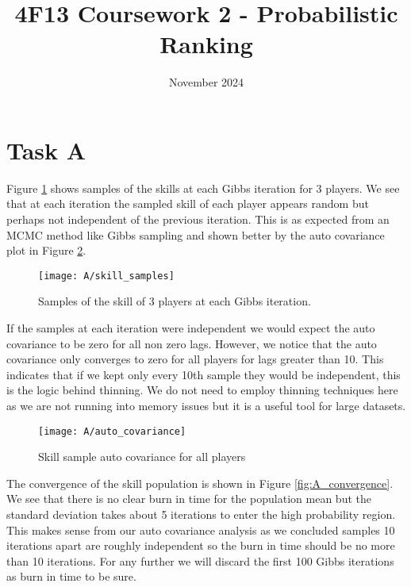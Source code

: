 \documentclass[11pt]{article}
\title{\vspace{-2cm}4F13 Coursework 2 - Probabilistic Ranking}
\author{}
\date{November 2024}
\begin{document}
% 

\setcounter{page}{1}

\maketitle

\section{Task A}

Figure \ref{fig:A_skill_samples} shows samples of the skills at each Gibbs iteration for 3 players. We see that at each iteration the sampled skill of each player appears random but perhaps not independent of the previous iteration. This is as expected from an MCMC method like Gibbs sampling and shown better by the auto covariance plot in Figure \ref{fig:A_auto_covariance}. 

\begin{figure}[h]
    \centering
    \texttt{[image: A/skill\_samples]} 
    \caption{Samples of the skill of 3 players at each Gibbs iteration.}
    \label{fig:A_skill_samples}
\end{figure}

If the samples at each iteration were independent we would expect the auto covariance to be zero for all non zero lags. However, we notice that the auto covariance only converges to zero for all players for lags greater than 10. This indicates that if we kept only every 10th sample they would be independent, this is the logic behind thinning. We do not need to employ thinning techniques here as we are not running into memory issues but it is a useful tool for large datasets.

\begin{figure}[h]
    \centering
    \texttt{[image: A/auto\_covariance]} 
    \caption{Skill sample auto covariance for all players}
    \label{fig:A_auto_covariance}
\end{figure}

The convergence of the skill population is shown in Figure \ref{fig:A_convergence}. We see that there is no clear burn in time for the population mean but the standard deviation takes about 5 iterations to enter the high probability region. This makes sense from our auto covariance analysis as we concluded samples 10 iterations apart are roughly independent so the burn in time should be no more than 10 iterations. For any further we will discard the first 100 Gibbs iterations as burn in time to be sure.
\end{document}
